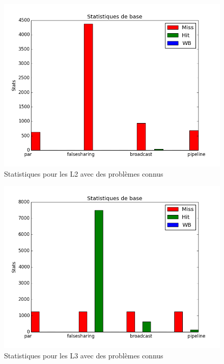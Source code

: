 \begin{figure}[!h]
\begin{center}
   \includegraphics[scale=0.40]{images/stats_L2.png}
   \caption{\label{img:inclusifs} Statistiques pour les L2 avec des problèmes connus}
\end{center}
\end{figure}

\begin{figure}[!h]
\begin{center}
   \includegraphics[scale=0.40]{images/stats_L3.png}
   \caption{\label{img:inclusifs} Statistiques pour les L3 avec des problèmes connus}
\end{center}
\end{figure}


